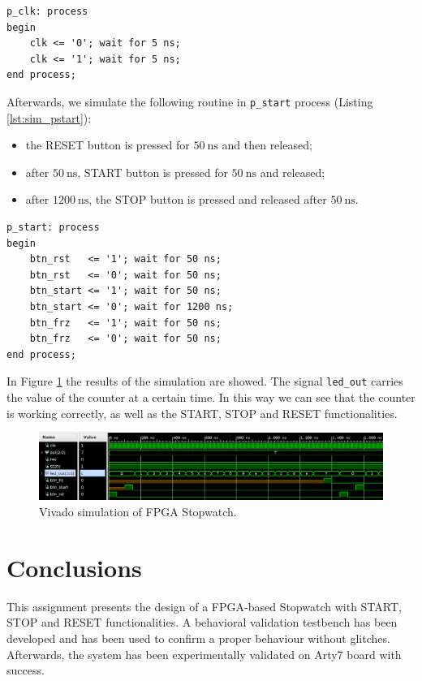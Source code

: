 \documentclass[11pt, a4paper]{article}
\begin{document}
\begin{lstlisting}[style=vhdl,label={lst:sim_clk},caption={{\footnotesize\texttt{p\_clk}} process.}]
p_clk: process
begin
    clk <= '0'; wait for 5 ns;
    clk <= '1'; wait for 5 ns;
end process;\end{lstlisting}


Afterwards, we simulate the following routine in {\footnotesize\texttt{p\_start}} process (Listing \ref{lst:sim_pstart}):
\begin{itemize}
    \item the RESET button is pressed for $\SI{50}{\ns}$ and then released;
    \item after $\SI{50}{\ns}$, START button is pressed for $\SI{50}{\ns}$ and released;
    \item after $\SI{1200}{\ns}$, the STOP button is pressed and released after $\SI{50}{\ns}$.
\end{itemize}


\begin{lstlisting}[style=vhdl,label={lst:sim_pstart},caption={{\footnotesize\texttt{p\_start}} process.}]
p_start: process
begin
    btn_rst   <= '1'; wait for 50 ns;
    btn_rst   <= '0'; wait for 50 ns;
    btn_start <= '1'; wait for 50 ns;
    btn_start <= '0'; wait for 1200 ns;
    btn_frz   <= '1'; wait for 50 ns;
    btn_frz   <= '0'; wait for 50 ns;
end process;\end{lstlisting}

In Figure \ref{fig:sim_1} the results of the simulation are showed. The signal {\footnotesize\texttt{led\_out}} carries the value of the counter at a certain time. In this way we can see that the counter is working correctly, as well as the START, STOP and RESET functionalities.


\begin{figure}[H]
\centering
\includegraphics[width=1\textwidth]{../main/image/sim_2.png}
\caption{\label{fig:sim_1} Vivado simulation of FPGA Stopwatch.}
\end{figure}





\section{Conclusions}
This assignment presents the design of a FPGA-based Stopwatch with START, STOP and RESET functionalities.
A behavioral validation testbench has been developed and has been used to confirm a proper behaviour without glitches.
Afterwards, the system has been experimentally validated on Arty7 board with success.
\end{document}
